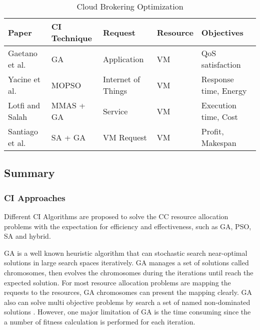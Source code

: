 \documentclass[onecolumn,10pt]{asme2ej}
\begin{document}
\begin{table}[H]
\begin{center}
\begin{tabular}[b]{|l|llll}
\rowcolor[gray]{.4}
\color{white}Paper    							  & \color{white}CI Technique & \color{white}Request     & \color{white}Resource    &\color{white}Objectives  \\ \hline 
Gaetano et al. \cite{anastasi2014qbrokage}   	  & GA       				  & Application				 & VM 						& QoS satisfaction	\\ \hline
Yacine et al. \cite{kessaci2013pareto}   	      & MOPSO 					  & Internet of Things       & VM 						& Response time, Energy  \\ \hline
Lotfi and Salah \cite{hajjem2016mmas}       	  & MMAS + GA     			  & Service  			     & VM  						& Execution time, Cost  \\ \hline
Santiago et al. \cite{iturriaga2013parallel} 	  & SA + GA 				  & VM Request      		 & VM 						& Profit, Makespan  \\ 
\end{tabular}
\end{center}
\caption{Cloud Brokering Optimization}
\label{Broker}
\end{table}

\subsection{Summary}
\subsubsection{CI Approaches}
Different CI Algorithms are proposed to solve the CC resource allocation problems with the expectation for efficiency and effectiveness, such as GA, PSO, SA and hybrid.

GA is a well known heuristic algorithm that can stochastic search near-optimal solutions in large search spaces iteratively. GA manages a set of solutions called chromosomes, then evolves the chromosomes during the iterations until reach the expected solution. For most resource allocation problems are mapping the requests to the resources, GA chromosomes can present the mapping clearly. GA also can solve multi objective problems by search a set of named non-dominated solutions \cite{anastasi2014qbrokage, tan2016optimization, zhao2011multi}. However, one major limitation of GA is the time consuming since the a number of fitness calculation is performed for each iteration. 
\end{document}

